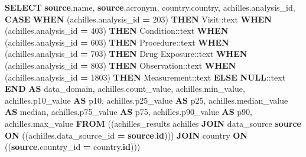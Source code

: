 \documentclass[
]{book}
\newenvironment{Shaded}{\begin{snugshade}}{\end{snugshade}}
\newcommand{\CharTok}[1]{\textcolor[rgb]{0.31,0.60,0.02}{#1}}
\newcommand{\ControlFlowTok}[1]{\textcolor[rgb]{0.13,0.29,0.53}{\textbf{#1}}}
\newcommand{\DecValTok}[1]{\textcolor[rgb]{0.00,0.00,0.81}{#1}}
\newcommand{\FunctionTok}[1]{\textcolor[rgb]{0.00,0.00,0.00}{#1}}
\newcommand{\KeywordTok}[1]{\textcolor[rgb]{0.13,0.29,0.53}{\textbf{#1}}}
\newcommand{\NormalTok}[1]{#1}
\newcommand{\OperatorTok}[1]{\textcolor[rgb]{0.81,0.36,0.00}{\textbf{#1}}}
\newcommand{\StringTok}[1]{\textcolor[rgb]{0.31,0.60,0.02}{#1}}
\begin{document}
\begin{Shaded}
\begin{Highlighting}[]
\KeywordTok{SELECT} \KeywordTok{source}\NormalTok{.name,}
   \KeywordTok{source}\NormalTok{.acronym,}
\NormalTok{   country.country,}
\NormalTok{   achilles.analysis\_id,}
       \ControlFlowTok{CASE}
           \ControlFlowTok{WHEN}\NormalTok{ (achilles.analysis\_id }\OperatorTok{=} \DecValTok{203}\NormalTok{) }\ControlFlowTok{THEN} \StringTok{\textquotesingle{}Visit\textquotesingle{}}\NormalTok{:}\CharTok{:text}
           \ControlFlowTok{WHEN}\NormalTok{ (achilles.analysis\_id }\OperatorTok{=} \DecValTok{403}\NormalTok{) }\ControlFlowTok{THEN} \StringTok{\textquotesingle{}Condition\textquotesingle{}}\NormalTok{:}\CharTok{:text}
           \ControlFlowTok{WHEN}\NormalTok{ (achilles.analysis\_id }\OperatorTok{=} \DecValTok{603}\NormalTok{) }\ControlFlowTok{THEN} \StringTok{\textquotesingle{}Procedure\textquotesingle{}}\NormalTok{:}\CharTok{:text}
           \ControlFlowTok{WHEN}\NormalTok{ (achilles.analysis\_id }\OperatorTok{=} \DecValTok{703}\NormalTok{) }\ControlFlowTok{THEN} \StringTok{\textquotesingle{}Drug Exposure\textquotesingle{}}\NormalTok{:}\CharTok{:text}
           \ControlFlowTok{WHEN}\NormalTok{ (achilles.analysis\_id }\OperatorTok{=} \DecValTok{803}\NormalTok{) }\ControlFlowTok{THEN} \StringTok{\textquotesingle{}Observation\textquotesingle{}}\NormalTok{:}\CharTok{:text}
           \ControlFlowTok{WHEN}\NormalTok{ (achilles.analysis\_id }\OperatorTok{=} \DecValTok{1803}\NormalTok{) }\ControlFlowTok{THEN} \StringTok{\textquotesingle{}Measurement\textquotesingle{}}\NormalTok{:}\CharTok{:text}
           \ControlFlowTok{ELSE} \KeywordTok{NULL}\NormalTok{:}\CharTok{:text}
       \ControlFlowTok{END} \KeywordTok{AS}\NormalTok{ data\_domain,}
\NormalTok{   achilles.count\_value,}
\NormalTok{   achilles.min\_value,}
\NormalTok{   achilles.p10\_value }\KeywordTok{AS}\NormalTok{ p10,}
\NormalTok{   achilles.p25\_value }\KeywordTok{AS}\NormalTok{ p25,}
\NormalTok{   achilles.median\_value }\KeywordTok{AS} \FunctionTok{median}\NormalTok{,}
\NormalTok{   achilles.p75\_value }\KeywordTok{AS}\NormalTok{ p75,}
\NormalTok{   achilles.p90\_value }\KeywordTok{AS}\NormalTok{ p90,}
\NormalTok{   achilles.max\_value}
  \KeywordTok{FROM}\NormalTok{ ((achilles\_results achilles}
    \KeywordTok{JOIN}\NormalTok{ data\_source }\KeywordTok{source} \KeywordTok{ON}\NormalTok{ ((achilles.data\_source\_id }\OperatorTok{=} \KeywordTok{source}\NormalTok{.}\KeywordTok{id}\NormalTok{)))}
    \KeywordTok{JOIN}\NormalTok{ country }\KeywordTok{ON}\NormalTok{ ((}\KeywordTok{source}\NormalTok{.country\_id }\OperatorTok{=}\NormalTok{ country.}\KeywordTok{id}\NormalTok{)))}

\end{Highlighting}
\end{Shaded}
\end{document}
